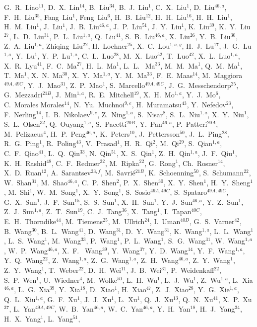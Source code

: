 {\begin{small}
\begin{center}
G.~R.~Liao$^{11}$, D.~X.~Lin$^{14}$, B.~Liu$^{34}$, B.~J.~Liu$^{1}$, C.~X.~Liu$^{1}$, D.~Liu$^{46,a}$, F.~H.~Liu$^{35}$, Fang~Liu$^{1}$, Feng~Liu$^{6}$, H.~B.~Liu$^{12}$, H.~H.~Liu$^{16}$, H.~H.~Liu$^{1}$, H.~M.~Liu$^{1}$, J.~Liu$^{1}$, J.~B.~Liu$^{46,a}$, J.~P.~Liu$^{51}$, J.~Y.~Liu$^{1}$, K.~Liu$^{39}$, K.~Y.~Liu$^{27}$, L.~D.~Liu$^{31}$, P.~L.~Liu$^{1,a}$, Q.~Liu$^{41}$, S.~B.~Liu$^{46,a}$, X.~Liu$^{26}$, Y.~B.~Liu$^{30}$, Z.~A.~Liu$^{1,a}$, Zhiqing~Liu$^{22}$, H.~Loehner$^{25}$, X.~C.~Lou$^{1,a,g}$, H.~J.~Lu$^{17}$, J.~G.~Lu$^{1,a}$, Y.~Lu$^{1}$, Y.~P.~Lu$^{1,a}$, C.~L.~Luo$^{28}$, M.~X.~Luo$^{52}$, T.~Luo$^{42}$, X.~L.~Luo$^{1,a}$, X.~R.~Lyu$^{41}$, F.~C.~Ma$^{27}$, H.~L.~Ma$^{1}$, L.~L. ~Ma$^{33}$, M.~M.~Ma$^{1}$, Q.~M.~Ma$^{1}$, T.~Ma$^{1}$, X.~N.~Ma$^{30}$, X.~Y.~Ma$^{1,a}$, Y.~M.~Ma$^{33}$, F.~E.~Maas$^{14}$, M.~Maggiora$^{49A,49C}$, Y.~J.~Mao$^{31}$, Z.~P.~Mao$^{1}$, S.~Marcello$^{49A,49C}$, J.~G.~Messchendorp$^{25}$, G.~Mezzadri$^{21B}$, J.~Min$^{1,a}$, R.~E.~Mitchell$^{19}$, X.~H.~Mo$^{1,a}$, Y.~J.~Mo$^{6}$, C.~Morales Morales$^{14}$, N.~Yu.~Muchnoi$^{9,e}$, H.~Muramatsu$^{43}$, Y.~Nefedov$^{23}$, F.~Nerling$^{14}$, I.~B.~Nikolaev$^{9,e}$, Z.~Ning$^{1,a}$, S.~Nisar$^{8}$, S.~L.~Niu$^{1,a}$, X.~Y.~Niu$^{1}$, S.~L.~Olsen$^{32}$, Q.~Ouyang$^{1,a}$, S.~Pacetti$^{20B}$, Y.~Pan$^{46,a}$, P.~Patteri$^{20A}$, M.~Pelizaeus$^{4}$, H.~P.~Peng$^{46,a}$, K.~Peters$^{10}$, J.~Pettersson$^{50}$, J.~L.~Ping$^{28}$, R.~G.~Ping$^{1}$, R.~Poling$^{43}$, V.~Prasad$^{1}$, H.~R.~Qi$^{2}$, M.~Qi$^{29}$, S.~Qian$^{1,a}$, C.~F.~Qiao$^{41}$, L.~Q.~Qin$^{33}$, N.~Qin$^{51}$, X.~S.~Qin$^{1}$, Z.~H.~Qin$^{1,a}$, J.~F.~Qiu$^{1}$, K.~H.~Rashid$^{48}$, C.~F.~Redmer$^{22}$, M.~Ripka$^{22}$, G.~Rong$^{1}$, Ch.~Rosner$^{14}$, X.~D.~Ruan$^{12}$, A.~Sarantsev$^{23,f}$, M.~Savri\'e$^{21B}$, K.~Schoenning$^{50}$, S.~Schumann$^{22}$, W.~Shan$^{31}$, M.~Shao$^{46,a}$, C.~P.~Shen$^{2}$, P.~X.~Shen$^{30}$, X.~Y.~Shen$^{1}$, H.~Y.~Sheng$^{1}$, M.~Shi$^{1}$, W.~M.~Song$^{1}$, X.~Y.~Song$^{1}$, S.~Sosio$^{49A,49C}$, S.~Spataro$^{49A,49C}$, G.~X.~Sun$^{1}$, J.~F.~Sun$^{15}$, S.~S.~Sun$^{1}$, X.~H.~Sun$^{1}$, Y.~J.~Sun$^{46,a}$, Y.~Z.~Sun$^{1}$, Z.~J.~Sun$^{1,a}$, Z.~T.~Sun$^{19}$, C.~J.~Tang$^{36}$, X.~Tang$^{1}$, I.~Tapan$^{40C}$, E.~H.~Thorndike$^{44}$, M.~Tiemens$^{25}$, M.~Ullrich$^{24}$, I.~Uman$^{40D}$, G.~S.~Varner$^{42}$, B.~Wang$^{30}$, B.~L.~Wang$^{41}$, D.~Wang$^{31}$, D.~Y.~Wang$^{31}$, K.~Wang$^{1,a}$, L.~L.~Wang$^{1}$, L.~S.~Wang$^{1}$, M.~Wang$^{33}$, P.~Wang$^{1}$, P.~L.~Wang$^{1}$, S.~G.~Wang$^{31}$, W.~Wang$^{1,a}$, W.~P.~Wang$^{46,a}$, X.~F. ~Wang$^{39}$, Y.~Wang$^{37}$, Y.~D.~Wang$^{14}$, Y.~F.~Wang$^{1,a}$, Y.~Q.~Wang$^{22}$, Z.~Wang$^{1,a}$, Z.~G.~Wang$^{1,a}$, Z.~H.~Wang$^{46,a}$, Z.~Y.~Wang$^{1}$, Z.~Y.~Wang$^{1}$, T.~Weber$^{22}$, D.~H.~Wei$^{11}$, J.~B.~Wei$^{31}$, P.~Weidenkaff$^{22}$, S.~P.~Wen$^{1}$, U.~Wiedner$^{4}$, M.~Wolke$^{50}$, L.~H.~Wu$^{1}$, L.~J.~Wu$^{1}$, Z.~Wu$^{1,a}$, L.~Xia$^{46,a}$, L.~G.~Xia$^{39}$, Y.~Xia$^{18}$, D.~Xiao$^{1}$, H.~Xiao$^{47}$, Z.~J.~Xiao$^{28}$, Y.~G.~Xie$^{1,a}$, Q.~L.~Xiu$^{1,a}$, G.~F.~Xu$^{1}$, J.~J.~Xu$^{1}$, L.~Xu$^{1}$, Q.~J.~Xu$^{13}$, Q.~N.~Xu$^{41}$, X.~P.~Xu$^{37}$, L.~Yan$^{49A,49C}$, W.~B.~Yan$^{46,a}$, W.~C.~Yan$^{46,a}$, Y.~H.~Yan$^{18}$, H.~J.~Yang$^{34}$, H.~X.~Yang$^{1}$, L.~Yang$^{51}$, 
\end{center}
\end{small}}
